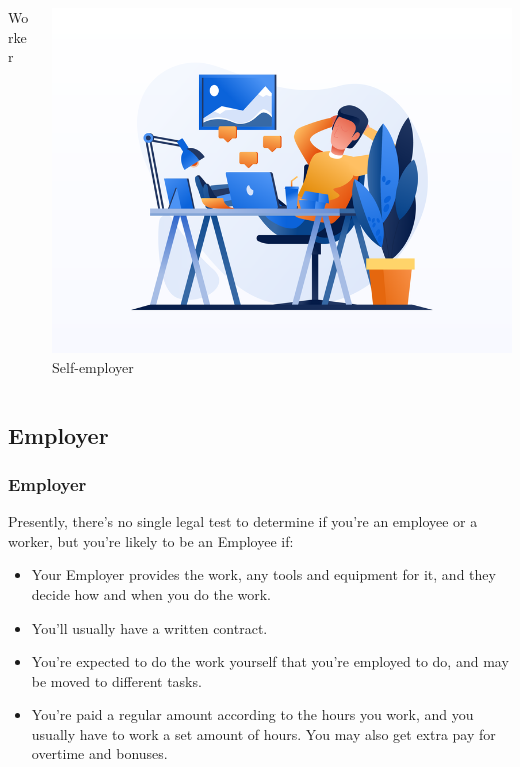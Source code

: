 \begin{frame}
\begin{columns}
\begin{column}{.4\textwidth}
\begin{center}
            Worker
            \end{center}
        \end{column}
        \hspace*{-0.5cm}
        \begin{column}{.4\textwidth}
            \begin{center} \includegraphics[width=\textwidth]{figures/self-employer.png}
            Self-employer
            \end{center}
        \end{column}
    \end{columns}
\end{frame}
\subsection[Employer]{Employer}
\begin{frame}
	\frametitle{Employer}
	Presently, there’s no single legal test to determine if you’re an employee or a worker, but you’re likely to be an Employee if:
	\vspace{2mm}
	\fontsize{9}{12}\selectfont
	 \begin{itemize} \itemsep0.3em
	    \item Your Employer provides the work, any tools and equipment for it, and they decide how and when you do the work.
	    \item You’ll usually have a written contract.
	    \item You’re expected to do the work yourself that you’re employed to do, and may be moved to different tasks.
	    \item You’re paid a regular amount according to the hours you work, and you usually have to work a set amount of hours. You may also get extra pay for overtime and bonuses.
	 \end{itemize}
\end{frame}


